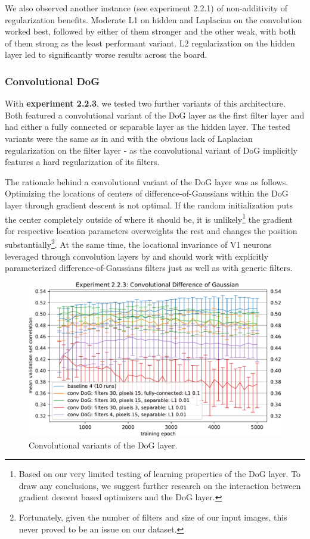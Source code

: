 We also observed another instance (see experiment 2.2.1) of non-additivity of regularization benefits. Moderate L1 on hidden and Laplacian on the convolution worked best, followed by either of them stronger and the other weak, with both of them strong as the least performant variant. L2 regularization on the hidden layer led to significantly worse results across the board.

\subsubsection{Convolutional DoG}

With \textbf{experiment 2.2.3}, we tested two further variants of this architecture. Both featured a convolutional variant of the DoG layer as the first filter layer and had either a fully connected or separable layer as the hidden layer. The tested variants were the same as in  and  with the obvious lack of Laplacian regularization on the filter layer - as the convolutional variant of DoG implicitly features a hard regularization of its filters.

The rationale behind a convolutional variant of the DoG layer was as follows. Optimizing the locations of centers of difference-of-Gaussians within the DoG layer through gradient descent is not optimal. If the random initialization puts the center completely outside of where it should be, it is unlikely\footnote{Based on our very limited testing of learning properties of the DoG layer. To draw any conclusions, we suggest further research on the interaction between gradient descent based optimizers and the DoG layer.} the gradient for respective location parameters overweights the rest and changes the position substantially\footnote{Fortunately, given the number of filters and size of our input images, this never proved to be an issue on our dataset.}. At the same time, the locational invariance of V1 neurons leveraged through convolution layers by \citeauthor{klindt} and \citeauthor{ecker} should work with explicitly parameterized difference-of-Gaussians filters just as well as with generic filters.

\begin{figure}[H]
    \centering
    \includegraphics[width=1\textwidth]{../figures/05_2_2_3}
    \caption[Experiment 2.2.3]{Convolutional variants of the DoG layer.}
    \label{fig:5.2.2.3}
\end{figure}

